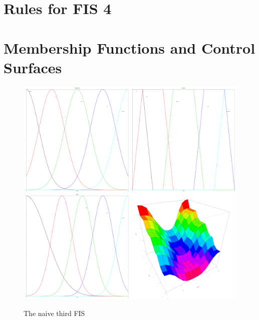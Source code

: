 \documentclass[12pt, a4paper]{report}
\begin{document}
\section{Rules for FIS 4}


\section{Membership Functions and Control Surfaces}

\begin{figure}[ht]
  \centering
  \caption{The naive third FIS}
  \includegraphics[width=0.4\textheight]{membershipFns03.png}
  \label{fig:membershipfns3}
\end{figure}
\end{document}
